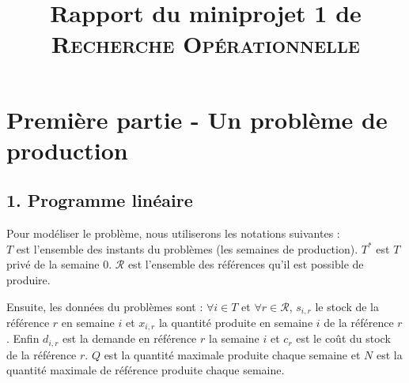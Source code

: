 \documentclass{rapport}
\title{Rapport du miniprojet 1 de \textsc{Recherche Opérationnelle}}
\begin{document}
\maketitle

\section{Première partie - Un problème de production}

\subsection{1. Programme linéaire}

Pour modéliser le problème, nous utiliserons les notations suivantes :
\ \\
$T$ est l'ensemble des instants du problèmes (les semaines de production). $T^*$ est $T$ privé de la semaine $0$. $\mathcal{R}$ est l'ensemble des références qu'il est possible de produire.

Ensuite, les données du problèmes sont : $\forall i \in T$ et $\forall r \in \mathcal{R}$, $s_{i,r}$ le stock de la référence $r$ en semaine $i$ et $x_{i,r}$ la quantité produite en semaine $i$ de la référence $r$. Enfin $d_{i,r}$ est la demande en référence $r$ la semaine $i$ et $c_r$ est le coût du stock de la référence $r$. $Q$ est la quantité maximale produite chaque semaine et $N$ est la quantité maximale de référence produite chaque semaine.
\ \\
\end{document}
